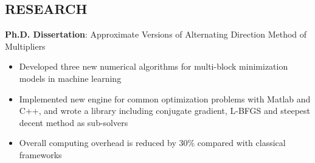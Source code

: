 \documentclass[10.5pt]{res} %
\begin{document}
\begin{resume}
\section{RESEARCH} \parskip 11pt
	\textbf{Ph.D. Dissertation}: Approximate Versions of Alternating Direction Method of Multipliers
	\begin{itemize}\itemsep -1pt
		\item Developed three new %
		 numerical algorithms for multi-block minimization models in machine learning  %
		\item Implemented new engine for common optimization problems with Matlab and C++, and wrote a library including conjugate gradient, L-BFGS and steepest decent method as sub-solvers
		\item Overall computing overhead is reduced by 30\% compared with classical frameworks
	\end{itemize}
%

\end{resume}
\end{document}
